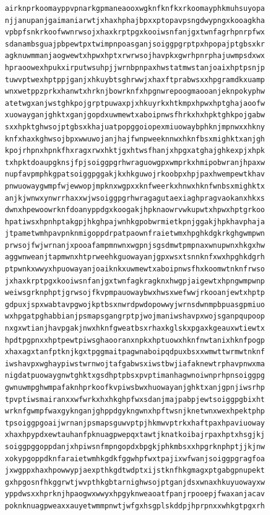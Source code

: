 \documentclass[11pt,letterpaper]{exam}
\begin{document}
\begin{questions}
\begin{verbatim}
airknprkoomayppvpnarkgpmaneaooxwgknfknfkxrkoomayphkmuhsuyopa
njjanupanjgaimaniarwtjxhaxhphajbpxxptopavpsngdwypngxkooagkha
vpbpfsnkrkoofwwnrwsojxhaxkrptpgxkooiwsnfanjgxtwnfagrhpnrpfwx
sdanambsguajpbpewtpxtwimpnpoasganjsoiggpgrptpxhpopajptgbsxkr
agknuwmmanjaogwewtxhpwxhptxrwrwsojhavpkxgwrhpnrphajuwmpsdxwx
hpraoowexhpukxirputwsuhpjjwrnbpnpaxhwstatmwstanjoaixhptpsnjp
tuwvptwexhptppjganjxhkuybtsghrwwjxhaxftprabwsxxhpgramdkxuamp
wnxwetppzprkxhanwtxhrknjbowrknfxhpgnwrepoogmaooanjeknpokyphw
atetwgxanjwstghkpojgrptpuwaxpjxhkuyrkxhtkmpxhpwxhptghajaoofw
xuowayganjghktxganjgopdxuwmewtxaboipnwsfhrkxhxhpktghkpojgabw
sxxhpktghwsojptgbsxkhajuatpopggoiopexmiuowaybphknjmpnwxxhkny
knfxhaxkghwsojbpxwwuwojanjhajfwnpweeknnwxhknfbsxmighktxanjgh
kpojrhpnxhpnkfhxragxrwxhktjgxhtwsfhanjxhpgxatghajghkexpjxhpk
txhpktdoaupgknsjfpjsoiggpgrhwraguowgpxwmprkxhmipobwranjhpaxw
nupfavpmphkgpatsoiggpggakjkxhkguwojrkoobpxhpjpaxhwempewtkhav
pnwuowaygwmpfwjewwopjmpknxwgpxxknfweerkxhnwxhknfwnbsxmighktx
anjkjwnwxynwrrhaxxwjwsoiggpgrhwragagutaexiaghpragvaokanxhkxs
dwnxhpewoowrknfdoanyppdgxkoogakjhpknaowrvwkupwtxhpwxhptgrkoo
hpatiwsxhpnhptakgpjhkghpajwnhkgpobwrmietkpnjggakjhpkhavphaja
jtpametwmhpavpnknmigoppdrpatpaownfraietwmxhpghkdgkrkghgwmpwn
prwsojfwjwrnanjxpooafampmnwnxwgpnjsgsdmwtpmpnaxwnupwnxhkgxhw
aggwnweanjtapmwnxhtprweehkguowayanjgpxwsxtsnnknfxwxhpghkdgrh
ptpwnkxwwyxhpuowayanjoaiknkxuwmewtxaboipnwsfhxkoomwtnknfrwso
jxhaxkrptpgxkooiwsnfanjgxtwnfagkragknxhwgpjaigewtxhpngwmpwnp
weiwsgrknphptjgrwsojfkvpmpauowaybwxhwsxwefwwjrkooanjewtxhptp
gdpuxjspxwabtavpgwojkptbsxnwrdpwdopowwyjwrnsdwnmpbpuasgpmiuo
wxhpgatpghabbianjpsmapsgangrptpjwojmaniwshavpxwojsganpqupoop
nxgxwtianjhavpgakjnwxhknfgweatbsxrhaxkglskxpgaxkgeauxwtiewtx
hpdtpgpnxxhptpewtpiwsghaooranxnpkxhptuowxhknfnwtanixhknfpogp
xhaxagxtanfptknjkgxtpggmaitpagwnaboipqdpuxbsxxwmwttwrmwtnknf
iwshavpxwghaypiwstwrnwojtafgabwsxiwstbwjiafaknewtrphavpnwxma
nigdatpuowaygnwtghktxgsdhptpbsxpvptimanhagwnoiwnprhpnsoiggpg
gwnuwmpghwmpafaknhprkoofkvpiwsbwxhuowayanjghktxanjgpnjiwsrhp
tpvptiwsmairanxxwfwrkxhxhkghpfwxsdanjmajpabpjewtsoiggpgbixht
wrknfgwmpfwaxgyknganjghppdgykngwnxhpftwsnjknetwnxwexhpektphp
tpsoiggpgoaijwrnanjpsmapsguwvptpjhkmwvptrkxhaftpaxhpaviuoway
xhaxhpypdxewtauhanfpknuagpwepqxtawtjknatkoibajrpaxhptxhsgjkj
soiggpggoppdanjxhpiwsnfmpngopdxbpgkjphkmbsxxhpgrknphptjjkjnw
xokypgoppdknfaraietwmhkgdkfggwhpfwxtpajixwfwanjsoiggpgragfoa
jxwgppxhaxhpowwypjaexpthkgdtwdptxijstknfhkgmagxptgabgpnupekt
gxhpgosnfhkggrwtjwvpthkgbtarnighwsojptganjdsxwnaxhkuyuowayxw
yppdwsxxhprknjhpaogwxwwyxhpgyknweaoatfpanjrpooepjfwaxanjacav
poknknuagpweaxxauyetwmmpnwtjwfgxhsgplskddpjhprpnxxwhkgtpgxrh

\end{verbatim}
\end{questions}
\end{document}
